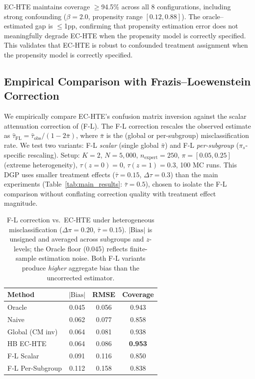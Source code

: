 EC-HTE maintains coverage $\geq$94.5\% across all 8 configurations, including strong confounding ($\beta{=}2.0$, propensity range $[0.12, 0.88]$).
The oracle--estimated gap is $\leq$1pp, confirming that propensity estimation error does not meaningfully degrade EC-HTE when the propensity model is correctly specified.
This validates that EC-HTE is robust to confounded treatment assignment when the propensity model is correctly specified.

\subsection{Empirical Comparison with Frazis--Loewenstein Correction}
\label{app:fl_comparison}

We empirically compare EC-HTE's confusion matrix inversion against the scalar attenuation correction of \citet{frazis2003estimating} (F-L).
The F-L correction rescales the observed estimate as $\hat{\tau}_{\text{FL}} = \hat{\tau}_{\text{obs}} / (1 - 2\bar{\pi})$, where $\bar{\pi}$ is the (global or per-subgroup) misclassification rate.
We test two variants: F-L \emph{scalar} (single global $\bar{\pi}$) and F-L \emph{per-subgroup} ($\pi_s$-specific rescaling).
Setup: $K{=}2$, $N{=}5{,}000$, $n_{\text{expert}}{=}250$, $\pi{=}[0.05, 0.25]$ (extreme heterogeneity), $\tau(z{=}0){=}0$, $\tau(z{=}1){=}0.3$, 100 MC runs.
This DGP uses smaller treatment effects ($\bar{\tau}{=}0.15$, $\Delta\tau{=}0.3$) than the main experiments (Table~\ref{tab:main_results}: $\bar{\tau}{=}0.5$), chosen to isolate the F-L comparison without conflating correction quality with treatment effect magnitude.

\begin{table}[h]
\centering
\caption{F-L correction vs.\ EC-HTE under heterogeneous misclassification ($\Delta\pi{=}0.20$, $\bar{\tau}{=}0.15$). $|\text{Bias}|$ is unsigned and averaged across subgroups and $z$-levels; the Oracle floor (0.045) reflects finite-sample estimation noise. Both F-L variants produce \emph{higher} aggregate bias than the uncorrected estimator.}
\label{tab:fl_comparison}
\small
\begin{tabular}{lccc}
\toprule
Method & $|\text{Bias}|$ & RMSE & Coverage \\
\midrule
Oracle         & 0.045 & 0.056 & 0.943 \\
Naive          & 0.062 & 0.077 & 0.858 \\
Global (CM inv)& 0.064 & 0.081 & 0.938 \\
HB EC-HTE      & 0.064 & 0.086 & \textbf{0.953} \\
F-L Scalar     & 0.091 & 0.116 & 0.850 \\
F-L Per-Subgroup & 0.112 & 0.158 & 0.838 \\
\bottomrule
\end{tabular}
\end{table}

